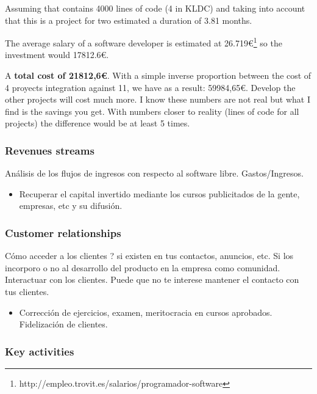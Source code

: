 \documentclass[11pt]{scrartcl}
\begin{document}
\par Assuming that contains 4000 lines of code (4 in KLDC) and taking into account that this is a project for two estimated a duration of 3.81 months.
\par The average salary of a software developer is estimated at 26.719\euro\footnote{http://empleo.trovit.es/salarios/programador-software} so the investment would 17812.6\euro.
    
\par A \textbf{total cost of 21812,6\euro}. With a simple inverse proportion between the cost of 4 proyects integration against 11, we have as a result: 59984,65\euro. Develop the other projects will cost much more. I know these numbers are not real but what I find is the savings you get. With numbers closer to reality (lines of code for all projects) the difference would be at least 5 times.

    
\subsubsection{Revenues streams}

\par Análisis de los flujos de ingresos con respecto al software libre. Gastos/Ingresos.
    \begin{itemize}
        \item Recuperar el capital invertido mediante los cursos publicitados de la gente, empresas, etc y su difusión.
    \end{itemize}
    
    
\subsubsection{Customer relationships}

Cómo acceder a los clientes ? si existen en
    tus contactos, anuncios, etc. Si los incorporo o no al desarrollo del producto
    en la empresa como comunidad. Interactuar con los clientes. Puede que no te
    interese mantener el contacto con tus clientes.
    
        \begin{itemize}
            \item Corrección de ejercicios, examen, meritocracia en cursos aprobados. Fidelización de clientes.
        \end{itemize}
    
    
\subsubsection{Key activities}
\end{document}

